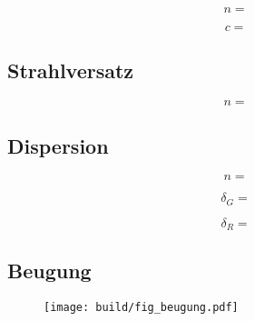 \begin{table}[H]
	\centering
	\caption{}
	
	\label{tab:brechung}
\end{table}

\begin{equation*}
	n = 
\end{equation*}

\begin{equation*}
	c = 
\end{equation*}


\subsection{Strahlversatz}

\begin{equation*}
	n = 
\end{equation*}

\begin{table}[H]
	\centering
	\caption{}
	
	\label{tab:plan}
\end{table}


\subsection{Dispersion}

\begin{equation*}
	n = 
\end{equation*}

\begin{table}[H]
	\centering
	\caption{}
	\makebox[\textwidth][c]{}
	\label{tab:pris}
\end{table}

\begin{equation*}
	\delta_G = 
\end{equation*}

\begin{equation*}
	\delta_R = 
\end{equation*}


\subsection{Beugung}

\begin{figure}[H]
	\texttt{[image: build/fig\_beugung.pdf]}
	\caption{}
	\label{fig:beugung}
\end{figure}
